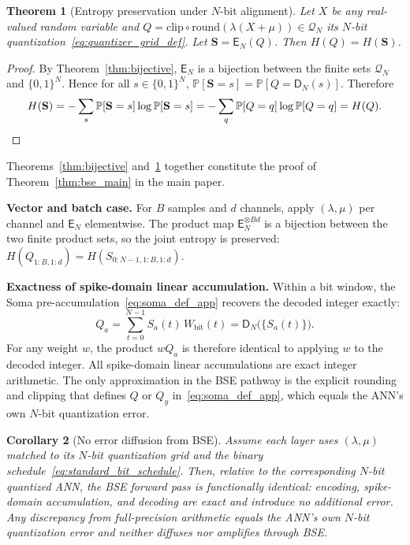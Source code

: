 \documentclass{article}
\theoremstyle{plain}
\newtheorem{theorem}{Theorem}[section]
\newtheorem{corollary}[theorem]{Corollary}
\theoremstyle{definition}
\theoremstyle{remark}
\begin{document}
\begin{theorem}[Entropy preservation under $N$-bit alignment]
\label{thm:entropy_preservation}
Let $X$ be any real-valued random variable and $Q = \mathrm{clip} \circ
\mathrm{round}(\lambda(X+\mu)) \in \mathcal{Q}_N$ its $N$-bit
quantization~\eqref{eq:quantizer_grid_def}. Let $\mathbf{S} = \mathsf{E}_N(Q)$.
Then $H(Q) = H(\mathbf{S})$.
\end{theorem}

\begin{proof}
By Theorem~\ref{thm:bijective}, $\mathsf{E}_N$ is a bijection between the finite sets
$\mathcal{Q}_N$ and $\{0,1\}^N$. Hence for all $s \in \{0,1\}^N$,
$\mathbb{P}[\mathbf{S} = s] = \mathbb{P}[Q = \mathsf{D}_N(s)]$. Therefore
\[
H(\mathbf{S})
= -\sum_{s} \mathbb{P}[\mathbf{S}=s] \log \mathbb{P}[\mathbf{S}=s]
= -\sum_{q} \mathbb{P}[Q=q] \log \mathbb{P}[Q=q]
= H(Q). \qedhere
\]
\end{proof}

Theorems~\ref{thm:bijective} and~\ref{thm:entropy_preservation} together constitute
the proof of Theorem~\ref{thm:bse_main} in the main paper.

\noindent\textbf{Vector and batch case.}
For $B$ samples and $d$ channels, apply $(\lambda, \mu)$ per channel and
$\mathsf{E}_N$ elementwise. The product map $\mathsf{E}_N^{\otimes Bd}$ is a
bijection between the two finite product sets, so the joint entropy is preserved:
$H(Q_{1:B,1:d}) = H(S_{0:N-1,1:B,1:d})$.

\noindent\textbf{Exactness of spike-domain linear accumulation.}
Within a bit window, the Soma pre-accumulation~\eqref{eq:soma_def_app} recovers the
decoded integer exactly:
\[
Q_a = \sum_{t=0}^{N-1} S_a(t)\,W_{\mathrm{bit}}(t) = \mathsf{D}_N\!\big(\{S_a(t)\}\big).
\]
For any weight $w$, the product $wQ_a$ is therefore identical to applying $w$ to the
decoded integer. All spike-domain linear accumulations are exact integer arithmetic.
The only approximation in the BSE pathway is the explicit rounding and clipping that
defines $Q$ or $Q_y$ in~\eqref{eq:soma_def_app}, which equals the ANN's own $N$-bit
quantization error.

\begin{corollary}[No error diffusion from BSE]
\label{cor:no_diffusion}
Assume each layer uses $(\lambda, \mu)$ matched to its $N$-bit quantization grid and
the binary schedule~\eqref{eq:standard_bit_schedule}. Then, relative to the
corresponding $N$-bit quantized ANN, the BSE forward pass is functionally identical:
encoding, spike-domain accumulation, and decoding are exact and introduce no
additional error. Any discrepancy from full-precision arithmetic equals the ANN's
own $N$-bit quantization error and neither diffuses nor amplifies through BSE.
\end{corollary}
\end{document}
